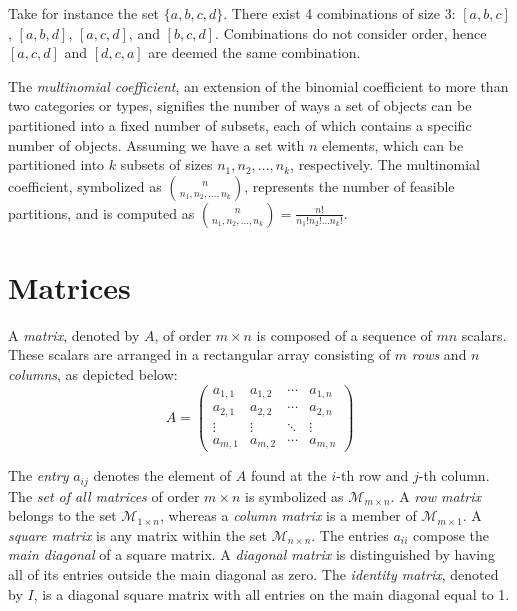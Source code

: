\begin{example}
Take for instance the set $\{a, b, c, d \}$. There exist 4 combinations of size 3: $[a, b, c]$, $[a, b, d]$, $[a, c, d]$, and $[b, c, d]$. Combinations do not consider order, hence $[a, c, d]$ and $[d, c, a]$ are deemed the same combination.
\end{example}

The \emph{multinomial coefficient}, an extension of the binomial coefficient to more than two categories or types, signifies the number of ways a set of objects can be partitioned into a fixed number of subsets, each of which contains a specific number of objects. Assuming we have a set with $n$ elements, which can be partitioned into $k$ subsets of sizes $n_1, n_2, \ldots, n_k$, respectively. The multinomial coefficient, symbolized as ${n \choose n_{1},n_{2},\ldots,n_{k}}$, represents the number of feasible partitions, and is computed as ${n \choose n_{1},n_{2},\ldots,n_{k}} = \frac{n!}{n_{1}!n_{2}!\ldots n_{k}!}$.

%
%

\section{Matrices}

A \emph{matrix}, denoted by $A$, of order $m \times n$ is composed of a sequence of $mn$ scalars. These scalars are arranged in a rectangular array consisting of $m$ \emph{rows} and $n$ \emph{columns}, as depicted below:
\[
A = 
 \begin{pmatrix}
  a_{1,1} & a_{1,2} & \cdots & a_{1,n} \\
  a_{2,1} & a_{2,2} & \cdots & a_{2,n} \\
  \vdots  & \vdots  & \ddots & \vdots  \\
  a_{m,1} & a_{m,2} & \cdots & a_{m,n} 
 \end{pmatrix}
\]

The \emph{entry} $a_{ij}$ denotes the element of $A$ found at the $i$-th row and $j$-th column. The \emph{set of all matrices} of order $m \times n$ is symbolized as $\mathcal{M}_{m \times n}$. A \emph{row matrix} belongs to the set $\mathcal{M}_{1 \times n}$, whereas a \emph{column matrix} is a member of $\mathcal{M}_{m \times 1}$. A \emph{square matrix} is any matrix within the set $\mathcal{M}_{n \times n}$. The entries $a_{ii}$ compose the \emph{main diagonal} of a square matrix. A \emph{diagonal matrix} is distinguished by having all of its entries outside the main diagonal as zero. The \emph{identity matrix}, denoted by $I$, is a diagonal square matrix with all entries on the main diagonal equal to 1.


